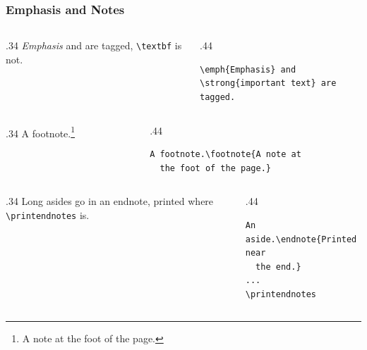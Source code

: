 \documentclass{ltx-talk}
\begin{document}
\begin{frame*}
  \frametitle{Emphasis and Notes}
  \begin{columns}
    \begin{column}{.34\textwidth}
      \emph{Emphasis} and  are tagged, \verb|\textbf|
      is not.
    \end{column}
    \begin{column}{.44\textwidth}
\small
\begin{verbatim}
\emph{Emphasis} and
\strong{important text} are tagged.
\end{verbatim}
    \end{column}
  \end{columns}

  \begin{columns}
    \begin{column}{.34\textwidth}
      A footnote.\footnote{A note at the foot of the page.}
    \end{column}
    \begin{column}{.44\textwidth}
\small
\begin{verbatim}
A footnote.\footnote{A note at
  the foot of the page.}
\end{verbatim}
    \end{column}
  \end{columns}

  \begin{columns}
    \begin{column}{.34\textwidth}
      Long asides go in an endnote, printed where \verb|\printendnotes| is.
    \end{column}
    \begin{column}{.44\textwidth}
\small
\begin{verbatim}
An aside.\endnote{Printed near
  the end.}
...
\printendnotes
\end{verbatim}
    \end{column}
  \end{columns}
\end{frame*}
\end{document}
